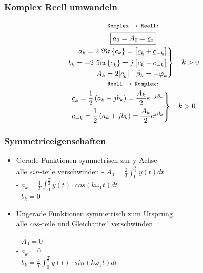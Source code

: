 \subsubsection{Komplex Reell umwandeln}
\begin{mdframed}[style=exercise]
	\begin{gather*}
		\texttt{\footnotesize Komplex $\rightarrow$ Reell:}\\
        \boxed{a_0 = A_0 = \underline{c}_0}\\
		\left.
		\begin{split}
			a_k = 2\ \mathfrak{Re}\left\{ c_k \right\}= \left[ \underline{c}_k+\underline{c}_{-k} \right]\\
			b_k = -2\ \mathfrak{Im}\left\{ \underline{c}_k \right\}= j\left[ \underline{c}_k-\underline{c}_{-k} \right]\\
			A_k = 2|\underline{c}_k| \quad \beta_k = -\varphi_k
		\end{split}\right\} \quad k>0\\
		\texttt{\footnotesize Reell $\rightarrow$ Komplex:}\\
		\left.
		\begin{split}
			\underline{c}_k = \frac{1}{2}\left( a_k-jb_k \right) = \frac{A_k}{2} e^{-j\beta_k}\\
			\underline{c}_{-k} = \frac{1}{2}\left( a_k+jb_k \right) = \frac{A_k}{2} e^{j\beta_k}
		\end{split}\right\} \quad k>0\\
	\end{gather*}
\end{mdframed}

\subsubsection{Symmetrieeigenschaften}
\begin{itemize}
	\item Gerade Funktionen
	      symmetrisch zur y-Achse\\
	      alle $sin$-teile verschwinden
	      - $A_0 = \frac{2}{T}\int^{\frac{T}{2}}_{0} y(t)dt$\\
	      - $a_{k} = \frac{4}{T}\int^{\frac{T}{2}}_{0}y(t)\cdot cos(k\omega_1t)dt$\\
	      - $b_k = 0$\\
	\item Ungerade Funktionen
	      symmetrisch zum Ursprung\\
	      alle $cos$-teile und Gleichanteil verschwinden

	      - $A_0 = 0$\\
	      - $a_k = 0$\\
	      - $b_{k} = \frac{4}{T}\int^{\frac{T}{2}}_{0} y(t)\cdot sin(k\omega_1t)dt$\\
\end{itemize}
